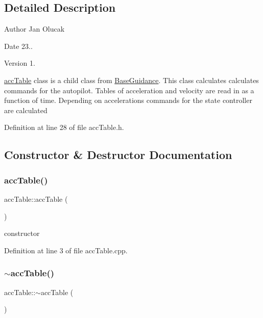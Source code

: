 \subsection{Detailed Description}
\begin{DoxyAuthor}{Author}
Jan Olucak 
\end{DoxyAuthor}
\begin{DoxyDate}{Date}
23.. 
\end{DoxyDate}
\begin{DoxyVersion}{Version}
1.
\end{DoxyVersion}
\hyperlink{classacc_table}{acc\+Table} class is a child class from \hyperlink{class_base_guidance}{Base\+Guidance}. This class calculates calculates commands for the autopilot. Tables of acceleration and velocity are read in as a function of time. Depending on accelerations commands for the state controller are calculated 

Definition at line 28 of file acc\+Table.\+h.



\subsection{Constructor \& Destructor Documentation}
\mbox{\label{classacc_table_a9f80e800ef73785c02c9aafa9a063c23}} 
\subsubsection{\texorpdfstring{acc\+Table()}{accTable()}}
{\footnotesize\ttfamily acc\+Table\+::acc\+Table (\begin{DoxyParamCaption}{ }\end{DoxyParamCaption})}



constructor 



Definition at line 3 of file acc\+Table.\+cpp.

\mbox{\label{classacc_table_a92eab1c773e7d0c4bf3408a8a85ed354}} 
\subsubsection{\texorpdfstring{$\sim$acc\+Table()}{~accTable()}}
{\footnotesize\ttfamily acc\+Table\+::$\sim$acc\+Table (\begin{DoxyParamCaption}{ }\end{DoxyParamCaption})}



